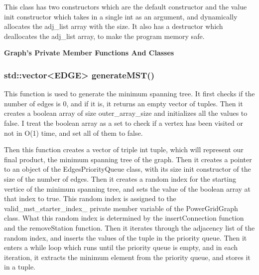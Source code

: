 \documentclass[a4paper]{article}
\begin{document}
		This class has two constructors which are the default constructor and the value init constructor which takes in a single 
		{\color{draculapurple}int} as an argument, and dynamically allocates the {\color{Turquoise}adj\_list} array with the size.
		It also has a destructor which deallocates the {\color{Turquoise}adj\_list} array, to make the program memory safe.

		\begin{center}
			\noindent\hrulefill\raisebox{-.3\ht\strutbox} { {\textbf{\Large{Graph's Private Member Functions And Classes}}} } \hrulefill\par
		\end{center}

		\subsubsection{{\color{orange} std::vector<{\color{azure}EDGE}> } {\color{draculapurple}generateMST}()}

			This function is used to generate the minimum spanning tree. It first checks if the number of edges is 0, and if it is, it returns an empty vector of tuples.
			Then it creates a boolean array of size {\color{draculapurple}outer\_array\_size} and initializes all the values to {\color{draculapurple}false}.
			I treat the boolean array as a set to check if a vertex has been visited or not in {\color{lightblue}O(1)} time, and set all of them to false.
			
			Then this function creates a vector of triple int tuple, which will represent our final product, the minimum spanning tree of the graph.
			Then it creates a pointer to an object of the {\color{draculapurple}EdgesPriorityQueue} class, with its size init constructor of the size of the number of edges.
			Then it creates a random index for the starting vertice of the minimum spanning tree, and sets the value of the boolean array at that index to {\color{draculapurple}true}.
			This random index is assigned to the {\color{Turquoise}valid\_mst\_starter\_index\_} private member variable of the {\color{draculapurple}PowerGridGraph} class.
			What this random index is determined by the {\color{draculapurple}insertConnection} function and the {\color{draculapurple}removeStation} function.
			Then it iterates through the adjacency list of the random index, and inserts the values of the tuple in the priority queue.
			Then it enters a while loop which runs until the priority queue is empty, and in each iteration, it extracts the minimum element from the priority queue, and stores it in a tuple.
\end{document}

